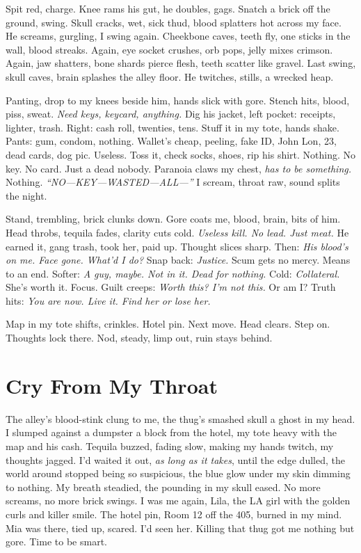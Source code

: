 \documentclass[12pt,oneside]{book} %
\begin{document}
Spit red, charge. Knee rams his gut, he doubles, gags. Snatch a brick off the ground, swing. Skull cracks, wet, sick thud, blood splatters hot across my face. He screams, gurgling, I swing again. Cheekbone caves, teeth fly, one sticks in the wall, blood streaks. Again, eye socket crushes, orb pops, jelly mixes crimson. Again, jaw shatters, bone shards pierce flesh, teeth scatter like gravel. Last swing, skull caves, brain splashes the alley floor. He twitches, stills, a wrecked heap.

Panting, drop to my knees beside him, hands slick with gore. Stench hits, blood, piss, sweat. \textit{Need keys, keycard, anything.} Dig his jacket, left pocket: receipts, lighter, trash. Right: cash roll, twenties, tens. Stuff it in my tote, hands shake. Pants: gum, condom, nothing. Wallet’s cheap, peeling, fake ID, \textnormal{John Lon}, 23, dead cards, dog pic. Useless. Toss it, check socks, shoes, rip his shirt. Nothing. No key. No card. Just a dead nobody. Paranoia claws my chest, \textit{has to be something.} Nothing. \textit{“NO—KEY—WASTED—ALL—”} I scream, throat raw, sound splits the night.

Stand, trembling, brick clunks down. Gore coats me, blood, brain, bits of him. Head throbs, tequila fades, clarity cuts cold. \textit{Useless kill. No lead. Just meat.} He earned it, gang trash, took her, paid up. Thought slices sharp. Then: \textit{His blood’s on me. Face gone. What’d I do?} Snap back: \textit{Justice.} Scum gets no mercy. Means to an end. Softer: \textit{A guy, maybe. Not in it. Dead for nothing.} Cold: \textit{Collateral.} She’s worth it. Focus. Guilt creeps: \textit{Worth this? I’m not this.} Or am I? Truth hits: \textit{You are now. Live it. Find her or lose her.}

Map in my tote shifts, crinkles. Hotel pin. Next move. Head clears. Step on. Thoughts lock there. Nod, steady, limp out, ruin stays behind.

\chapter{Cry From My Throat}

The alley’s blood-stink clung to me, the thug’s smashed skull a ghost in my head. I slumped against a dumpster a block from the hotel, my tote heavy with the map and his cash. Tequila buzzed, fading slow, making my hands twitch, my thoughts jagged. I’d waited it out, \textit{as long as it takes}, until the edge dulled, the world around stopped being so suspicious, the blue glow under my skin dimming to nothing. My breath steadied, the pounding in my skull eased. No more screams, no more brick swings. I was me again, \textnormal{Lila}, the LA girl with the golden curls and killer smile. The hotel pin, Room 12 off the 405, burned in my mind. Mia was there, tied up, scared. I’d seen her. Killing that thug got me nothing but gore. Time to be smart.
\end{document}
